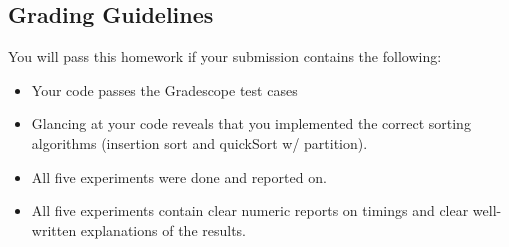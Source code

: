 \documentclass[11pt]{article}
\begin{document}
\subsection*{Grading Guidelines}

You will pass this homework if your submission contains the following:

\begin{itemize}
	\item Your code passes the Gradescope test cases
	\item Glancing at your code reveals that you implemented the correct sorting algorithms (insertion sort and quickSort w/ partition).
	\item All five experiments were done and reported on.
	\item All five experiments contain clear numeric reports on timings and clear well-written explanations of the results.
\end{itemize}
\end{document}
